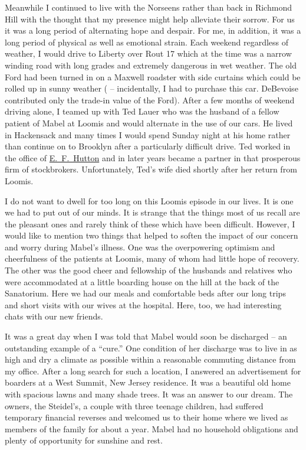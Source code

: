 \documentclass[12pt]{book}              %
\begin{document}
Meanwhile I continued to live with the Norseens rather than back in Richmond Hill with the thought that my presence might help alleviate their sorrow. For us it was a long period of alternating hope and despair. For me, in addition, it was a long period of physical as well as emotional strain. Each weekend regardless of weather, I would drive to Liberty over Rout 17 which at the time was a narrow winding road with long grades and extremely dangerous in wet weather. The old Ford had been turned in on a Maxwell roadster with side curtains which could be rolled up in sunny weather ( -- incidentally, I had to purchase this car. DeBevoise contributed only the trade-in value of the Ford). After a few months of weekend driving alone, I teamed up with Ted Lauer who was the husband of a fellow patient of Mabel at Loomis and would alternate in the use of our cars. He lived in Hackensack and many times I would spend Sunday night at his home rather than continue on to Brooklyn after a particularly difficult drive. Ted worked in the office of \href{http://en.wikipedia.org/wiki/E._F._Hutton_\%26_Co.}{E.~F.~Hutton} and in later years became a partner in that prosperous firm of stockbrokers. Unfortunately, Ted's wife died shortly after her return from Loomis. 

I do not want to dwell for too long on this Loomis episode in our lives. It is one we had to put out of our minds. It is strange that the things most of us recall are the pleasant ones and rarely think of these which have been difficult. However, I would like to mention two things that helped to soften the impact of our concern and worry during Mabel's illness. One was the overpowering optimism and cheerfulness of the patients at Loomis, many of whom had little hope of recovery. The other was the good cheer and fellowship of the husbands and relatives who were accommodated at a little boarding house on the hill at the back of the Sanatorium. Here we had our meals and comfortable beds after our long trips and short visits with our wives at the hospital. Here, too, we had interesting chats with our new friends.

It was a great day when I was told that Mabel would soon be discharged -- an outstanding example of a ``cure.'' One condition of her discharge was to live in as high and dry a climate as possible within a reasonable commuting distance from my office. After a long search for such a location, I answered an advertisement for boarders at a West Summit, New Jersey residence. It was a beautiful old home with spacious lawns and many shade trees. It was an answer to our dream. The owners, the Steidel's, a couple with three teenage children, had suffered temporary financial reverses and welcomed us to their home where we lived as members of the family for about a year. Mabel had no household obligations and plenty of opportunity for sunshine and rest. 
\end{document}
